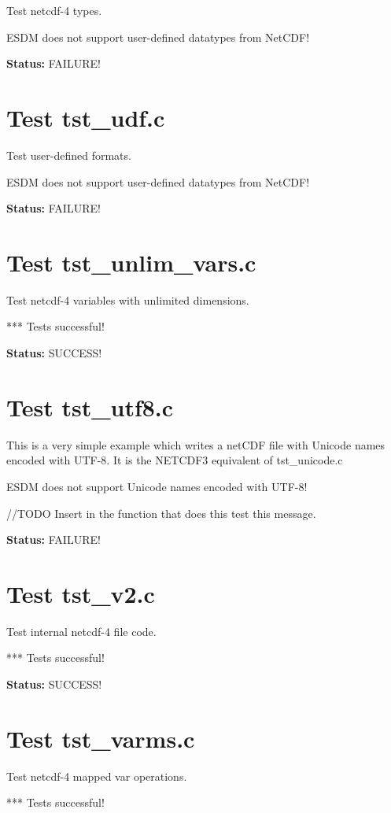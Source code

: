Test netcdf-4 types.

ESDM does not support user-defined datatypes from NetCDF!

{\bf \large Status: } FAILURE!

\section{Test tst\_udf.c}

Test user-defined formats.

ESDM does not support user-defined datatypes from NetCDF!

{\bf \large Status: } FAILURE!

\section{Test tst\_unlim\_vars.c}

Test netcdf-4 variables with unlimited dimensions.

*** Tests successful!

{\bf \large Status: } SUCCESS!

\section{Test tst\_utf8.c}

This is a very simple example which writes a netCDF file with Unicode names encoded with UTF-8. It is the NETCDF3 equivalent of tst\_unicode.c

ESDM does not support Unicode names encoded with UTF-8!

//TODO Insert in the function that does this test this message.

{\bf \large Status: } FAILURE!

\section{Test tst\_v2.c}

Test internal netcdf-4 file code.

*** Tests successful!

{\bf \large Status: } SUCCESS!

\section{Test tst\_varms.c}

Test netcdf-4 mapped var operations.

*** Tests successful!

